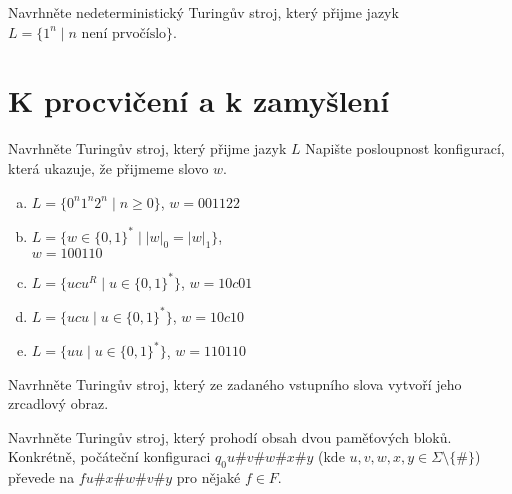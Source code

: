 \documentclass[a4paper,12pt]{amsart}
\begin{document}
\medskip\begin{problem}
    
    Navrhněte nedeterministický Turingův stroj, který přijme jazyk $L=\{1^n \mid\text{$n$ není prvočíslo}\}$.

\end{problem}
    

\section*{K procvičení a k zamyšlení}


\medskip\begin{problem}

    Navrhněte Turingův stroj, který přijme jazyk $L$ Napište posloupnost konfigurací, která ukazuje, že přijmeme slovo $w$. 
    
    \begin{multicols}{2}
    \begin{enumerate}[(a)]
        \item $L=\{0^n1^n2^n\mid n\geq 0\}$, $w=001122$
        \item $L=\{w\in\{0,1\}^*\mid |w|_0=|w|_1\}$,\\ $w=100110$
        \item $L=\{ucu^R\mid u\in\{0,1\}^*\}$, $w=10c01$
        \item $L=\{ucu\mid u \in\{0,1\}^*\}$, $w=10c10$
        \item $L=\{uu\mid u \in\{0,1\}^*\}$, $w=110110$
    \end{enumerate}
    \end{multicols}

\end{problem}

\begin{problem}[Zrcadlení]
    
    Navrhněte Turingův stroj, který ze zadaného vstupního slova vytvoří jeho zrcadlový obraz.

\end{problem}


\begin{problem}

    Navrhněte Turingův stroj, který prohodí obsah dvou paměťových bloků. Konkrétně, počáteční konfiguraci $q_0u\#v\#w\#x\#y$ (kde $u, v, w, x, y \in \Sigma\setminus\{\#\}$) převede na $fu\#x\#w\#v\#y$ pro nějaké $f\in F$. %

\end{problem}
    
\end{document}
